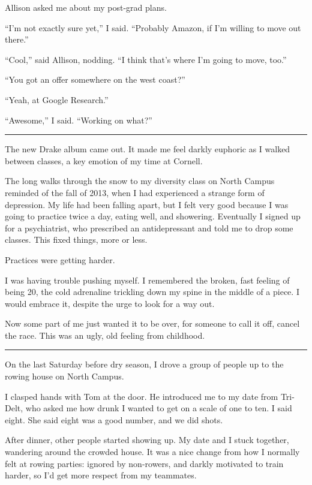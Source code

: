 Allison asked me about my post-grad plans.  

``I'm not exactly sure yet,'' I said.  ``Probably Amazon, if I'm willing to move
out there.''

``Cool,'' said Allison, nodding.  ``I think that's where I'm going to move,
too.''

``You got an offer somewhere on the west coast?''

``Yeah, at Google Research.''

``Awesome,'' I said.  ``Working on what?''

\plainfancybreak{12pt}{2}{}

The new Drake album came out.  It made me feel darkly euphoric as I walked
between classes, a key emotion of my time at Cornell.  

The long walks through the snow to my diversity class on North Campus reminded
of the fall of 2013, when I had experienced a strange form of depression.  My
life had been falling apart, but I felt very good because I was going to
practice twice a day, eating well, and showering.  Eventually I signed up for a
psychiatrist, who prescribed an antidepressant and told me to drop some classes.
This fixed things, more or less.

Practices were getting harder.

I was having trouble pushing myself.  I remembered the broken, fast feeling of
being 20, the cold adrenaline trickling down my spine in the middle of a piece.
I would embrace it, despite the urge to look for a way out.  

Now some part of me just wanted it to be over, for someone to call it off,
cancel the race.  This was an ugly, old feeling from childhood.

\plainfancybreak{12pt}{2}{}

On the last Saturday before dry season, I drove a group of people up to the
rowing house on North Campus.

I clasped hands with Tom at the door.  He introduced me to my date from
Tri-Delt, who asked me how drunk I wanted to get on a scale of one to ten. I
said eight.  She said eight was a good number, and we did shots.  

After dinner, other people started showing up.  My date and I stuck together,
wandering around the crowded house.  It was a nice change from how I normally
felt at rowing parties: ignored by non-rowers, and darkly motivated to train
harder, so I'd get more respect from my teammates.

